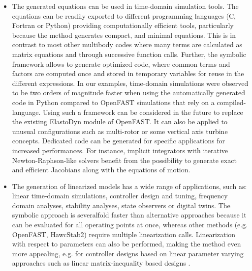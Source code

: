 \documentclass[wes, manuscript]{copernicus}
\begin{document}
\begin{itemize}
\item The generated equations can be used in time-domain simulation tools.
The equations can be readily exported to different programming languages (C, Fortran or Python)  providing computationally efficient tools, particularly because the method generates compact, and minimal equations.
This is in contrast to most other multibody codes where many terms are calculated as matrix equations and through successive function calls.
Further, the symbolic framework allows to generate optimized code, where common terms and factors are computed once and stored in temporary variables for reuse in the different expressions.
%
In our examples, time-domain simulations were observed to be two orders of magnitude faster when using the automatically generated code in Python compared to OpenFAST simulations that rely on a compiled-language. 
%
Using such a framework can be considered in the future to replace the existing ElastoDyn module of OpenFAST.
It can also be applied to unusual configurations such as multi-rotor or some vertical axis turbine concepts. 
%
Dedicated code can be generated for specific applications for increased performances.
For instance, implicit integrators with iterative Newton-Raphson-like solvers benefit from the possibility to generate exact and efficient Jacobians along with the equations of motion.





\item The generation of linearized models has a wide range of applications, such as: linear time-domain simulations, controller design and tuning, frequency domain analyses, stability analyses, state observers or digital twins.
The symbolic approach is severalfold faster than alternative approaches because it can be evaluated for all operating points at once, whereas other methods (e.g. OpenFAST, HawcStab2) require multiple linearization calls.
Linearization with respect to parameters can also be performed, making the method even more appealing, e.g. for controller designs based on linear parameter varying approaches such as linear matrix-inequality based designs \citep{Poschke:2020}.


\end{itemize}
\end{document}
